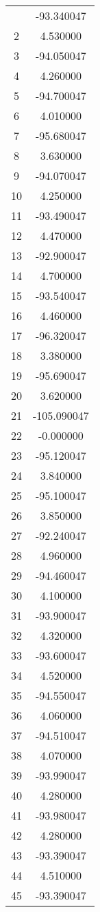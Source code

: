 \documentclass[12pt]{article}
\begin{document}
\begin{longtable}{@{}cc@{}}
\bottomrule
\endlastfoot
1 & -93.340047 \\
2 & 4.530000 \\
3 & -94.050047 \\
4 & 4.260000 \\
5 & -94.700047 \\
6 & 4.010000 \\
7 & -95.680047 \\
8 & 3.630000 \\
9 & -94.070047 \\
10 & 4.250000 \\
11 & -93.490047 \\
12 & 4.470000 \\
13 & -92.900047 \\
14 & 4.700000 \\
15 & -93.540047 \\
16 & 4.460000 \\
17 & -96.320047 \\
18 & 3.380000 \\
19 & -95.690047 \\
20 & 3.620000 \\
21 & -105.090047 \\
22 & -0.000000 \\
23 & -95.120047 \\
24 & 3.840000 \\
25 & -95.100047 \\
26 & 3.850000 \\
27 & -92.240047 \\
28 & 4.960000 \\
29 & -94.460047 \\
30 & 4.100000 \\
31 & -93.900047 \\
32 & 4.320000 \\
33 & -93.600047 \\
34 & 4.520000 \\
35 & -94.550047 \\
36 & 4.060000 \\
37 & -94.510047 \\
38 & 4.070000 \\
39 & -93.990047 \\
40 & 4.280000 \\
41 & -93.980047 \\
42 & 4.280000 \\
43 & -93.390047 \\
44 & 4.510000 \\
45 & -93.390047 \\

\end{longtable}
\end{document}
